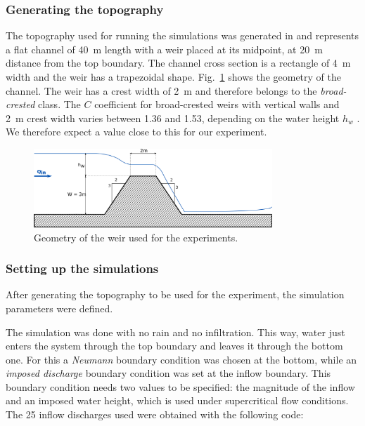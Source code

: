 \subsubsection{Generating the topography}
The topography used for running the simulations was generated in  and represents a flat channel of \SI{40}{\meter} length with a weir placed at its midpoint, at \SI{20}{\meter} distance from the top boundary.
The channel cross section is a rectangle of \SI{4}{\meter} width and the weir has a trapezoidal shape.
Fig.~\ref{fig:weir_scheme} shows the geometry of the channel.
The weir has a crest width of \SI{2}{\meter} and therefore belongs to the \emph{broad-crested} class. The $C$ coefficient for broad-crested weirs with vertical walls and \SI{2}{\meter} crest width varies between \num{1.36} and \num{1.53}, depending on the water height $h_w$ \autocite{brown_urban_2009}.
We therefore expect a value close to this for our experiment.

\begin{figure}[h]
  \centering
  \includegraphics[width=0.8\textwidth]{Figures/weir_scheme.png}
  \caption{Geometry of the weir used for the experiments.}
  \label{fig:weir_scheme}
\end{figure}

\subsubsection{Setting up the simulations}
After generating the topography to be used for the experiment, the simulation parameters were defined.

The simulation was done with no rain and no infiltration.
This way, water just enters the system through the top boundary and leaves it through the bottom one.
For this a \emph{Neumann} boundary condition was chosen at the bottom, while an \emph{imposed discharge} boundary condition was set at the inflow boundary.
This boundary condition needs two values to be specified: the magnitude of the inflow and an imposed water height, which is used under supercritical flow conditions.
The \num{25} inflow discharges used were obtained with the following  code:\\

